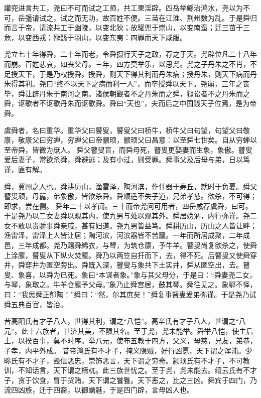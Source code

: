 \documentclass[UTF8,12pt,AutoFakeBold]{ctexart}
\begin{document}
讙兜进言共工，尧曰不可而试之工师，共工果淫辟。四岳举鲧治鸿水，尧以为不可，岳彊请试之，试之而无功，故百姓不便。三苗在江淮、荆州数为乱。于是舜归而言于帝，请流共工于幽陵，以变北狄；放驩兜于崇山，以变南蛮；迁三苗于三危，以变西戎；殛鲧于羽山，以变东夷：四罪而天下咸服。
\par
尧立七十年得舜，二十年而老，令舜摄行天子之政，荐之于天。尧辟位凡二十八年而崩。百姓悲哀，如丧父母。三年，四方莫举乐，以思尧。尧之子丹朱之不肖，不足授天下，于是乃权授舜。授舜，则天下得其利而丹朱病；授丹朱，则天下病而丹朱得其利。尧曰“终不以天下之病而利一人”，而卒授舜以天下。尧崩，三年之丧毕，舜让辟丹朱于南河之南。诸侯朝觐者不之丹朱而之舜，狱讼者不之丹朱而之舜，讴歌者不讴歌丹朱而讴歌舜。舜曰“天也”，夫而后之中国践天子位焉，是为帝舜。
\par
虞舜者，名曰重华。重华父曰瞽叟，瞽叟父曰桥牛，桥牛父曰句望，句望父曰敬康，敬康父曰穷蝉，穷蝉父曰帝颛顼，颛顼父曰昌意：以至舜七世矣。自从穷蝉以至帝舜，皆微为庶人。
舜父瞽叟盲，而舜母死，瞽叟更娶妻而生象，象傲。瞽叟爱后妻子，常欲杀舜，舜避逃；及有小过，则受罪。舜事父及后母与弟，日以笃谨，匪有解。
\par
舜，冀州之人也。舜耕历山，渔雷泽，陶河滨，作什器于寿丘，就时于负夏。舜父瞽叟顽，母嚚，弟象傲，皆欲杀舜。舜顺适不失子道，兄弟孝慈。欲杀，不可得；即求，尝在侧。
舜年二十以孝闻。三十而帝尧问可用者，四岳咸荐虞舜，曰可。于是尧乃以二女妻舜以观其内，使九男与处以观其外。舜居妫汭，内行弥谨。尧二女不敢以贵骄事舜亲戚，甚有妇道。尧九男皆益笃。舜耕历山，历山之人皆让畔；渔雷泽，雷泽上人皆让居；陶河滨，河滨器皆不苦窳。一年而所居成聚，二年成邑，三年成都。尧乃赐舜絺衣，与琴，为筑仓廪，予牛羊。瞽叟尚复欲杀之，使舜上涂廪，瞽叟从下纵火焚廪。舜乃以两笠自扞而下，去，得不死。后瞽叟又使舜穿井，舜穿井为匿空旁出。舜既入深，瞽叟与象共下土实井，舜从匿空出，去。瞽叟、象喜，以舜为已死。象曰“本谋者象。”象与其父母分，于是曰：“舜妻尧二女，与琴，象取之。牛羊仓廪予父母。”象乃止舜宫居，鼓其琴。舜往见之。象鄂不怿，曰：“我思舜正郁陶！”舜曰：“然，尔其庶矣！”舜复事瞽叟爱弟弥谨。于是尧乃试舜五典百官，皆治。
\par
昔高阳氏有才子八人，世得其利，谓之“八恺”。高辛氏有才子八人，世谓之“八元”。此十六族者，世济其美，不陨其名。至于尧，尧未能举。舜举八恺，使主后土，以揆百事，莫不时序。举八元，使布五教于四方，父义，母慈，兄友，弟恭，子孝，内平外成。
昔帝鸿氏有不才子，掩义隐贼，好行凶慝，天下谓之浑沌。少暤氏有不才子，毁信恶忠，崇饰恶言，天下谓之穷奇。颛顼氏有不才子，不可教训，不知话言，天下谓之檮杌。此三族世忧之。至于尧，尧未能去。缙云氏有不才子，贪于饮食，冒于货贿，天下谓之饕餮。天下恶之，比之三凶。舜宾于四门，乃流四凶族，迁于四裔，以御螭魅，于是四门辟，言毋凶人也。
\end{document}
